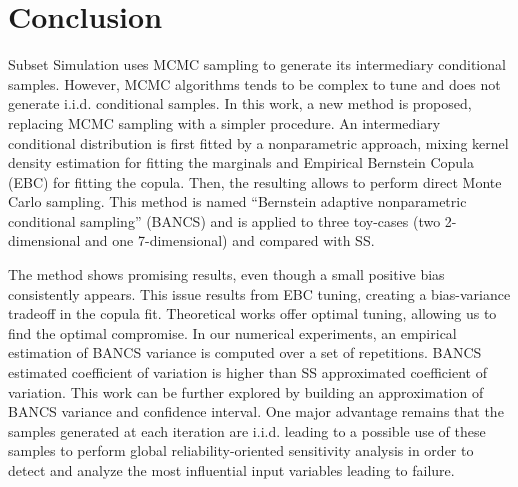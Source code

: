 \section{Conclusion}
Subset Simulation uses MCMC sampling to generate its intermediary conditional samples. 
However, MCMC algorithms tends to be complex to tune and does not generate i.i.d. conditional samples. 
In this work, a new method is proposed, replacing MCMC sampling with a simpler procedure. 
An intermediary conditional distribution is first fitted by a nonparametric approach, mixing kernel density estimation for fitting the marginals and Empirical Bernstein Copula (EBC) for fitting the copula. 
Then, the resulting allows to perform direct Monte Carlo sampling. 
This method is named ``Bernstein adaptive nonparametric conditional sampling'' (BANCS) and is applied to three toy-cases (two 2-dimensional and one 7-dimensional) and compared with SS.

The method shows promising results, even though a small positive bias consistently appears. 
This issue results from EBC tuning, creating a bias-variance tradeoff in the copula fit. 
Theoretical works offer optimal tuning, allowing us to find the optimal compromise. 
In our numerical experiments, an empirical estimation of BANCS variance is computed over a set of repetitions. 
BANCS estimated coefficient of variation is higher than SS approximated coefficient of variation. 
This work can be further explored by building an approximation of BANCS variance and confidence interval. 
One major advantage remains that the samples generated at each iteration are i.i.d. leading to a possible use of these samples to perform global reliability-oriented sensitivity analysis \citep{marrel_chabridon_2021} 
in order to detect and analyze the most influential input variables leading to failure.